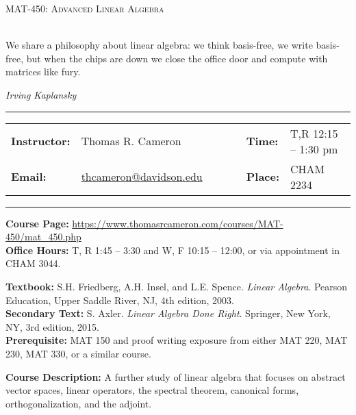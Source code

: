\documentclass[11pt, a4paper]{article}
\begin{document}
\begin{minipage}{0.5\textwidth}
\vspace*{-5em}
{\large \textsc{MAT-450: Advanced Linear Algebra}}\\
\\
\end{minipage}
\begin{minipage}{0.5\textwidth}
\epigraph{We share a philosophy about linear algebra: we think basis-free, we write basis-free, but when the chips are down we close the office door and compute with matrices like fury.}{\textit{Irving Kaplansky}}
\end{minipage}

\begin{center}
\rule{7in}{0.4pt}
\begin{minipage}[t]{.75\textwidth}
\begin{tabular}{llcccll}
\textbf{Instructor:} & Thomas R. Cameron & & &  & \textbf{Time:} & T,R 12:15 -- 1:30 pm\\
\textbf{Email:} &  \href{mailto:thcameron@davidson.edu}{thcameron@davidson.edu} & & & & \textbf{Place:} &  CHAM 2234
\end{tabular}
\end{minipage}
\rule{7in}{0.4pt}
\end{center}
\vspace{.5cm}
\setlength{\unitlength}{1in}
\renewcommand{\arraystretch}{2}

\noindent\textbf{Course Page:} \url{https://www.thomasrcameron.com/courses/MAT-450/mat_450.php}\\
\noindent\textbf{Office Hours:} T, R 1:45 -- 3:30 and W, F 10:15 -- 12:00, or via appointment in CHAM 3044.

\vspace*{.15in}
\noindent\textbf{Textbook:} S.H. Friedberg, A.H. Insel, and L.E. Spence. \textit{Linear Algebra}. Pearson Education, Upper Saddle River, NJ, 4th edition, 2003.\\
\noindent\textbf{Secondary Text:} S. Axler. \textit{Linear Algebra Done Right}. Springer, New York, NY, 3rd edition, 2015.\\
\noindent\textbf{Prerequisite:} MAT 150 and proof writing exposure from either MAT 220, MAT 230, MAT 330, or a similar course. 

\vspace*{.15in}
\noindent\textbf{Course Description:}
A further study of linear algebra that focuses on abstract vector spaces, linear operators, the spectral theorem, canonical forms, orthogonalization, and the adjoint. 
\end{document}

